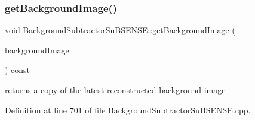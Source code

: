 \mbox{\label{class_background_subtractor_su_b_s_e_n_s_e_a04f6ee8e507bfc708b5b9b4ff97c16e0}} 
\subsubsection{\texorpdfstring{get\+Background\+Image()}{getBackgroundImage()}}
{\footnotesize\ttfamily void Background\+Subtractor\+Su\+B\+S\+E\+N\+S\+E\+::get\+Background\+Image (\begin{DoxyParamCaption}\item[{cv\+::\+Output\+Array}]{background\+Image }\end{DoxyParamCaption}) const}



returns a copy of the latest reconstructed background image 



Definition at line 701 of file Background\+Subtractor\+Su\+B\+S\+E\+N\+S\+E.\+cpp.


